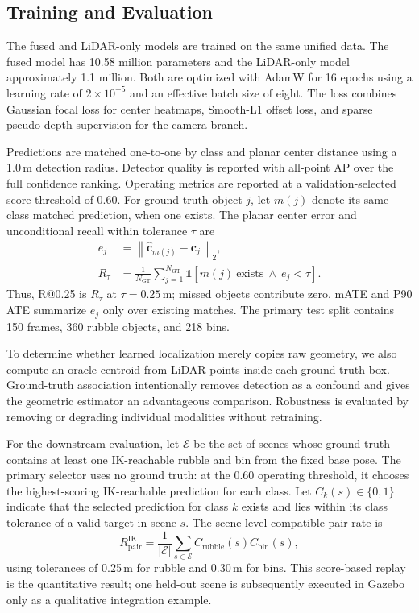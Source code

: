 \documentclass[conference]{IEEEtran}
\begin{document}
\subsection{Training and Evaluation}

The fused and LiDAR-only models are trained on the same unified data. The fused model has 10.58 million parameters and the LiDAR-only model approximately 1.1 million. Both are optimized with AdamW \cite{loshchilov2019decoupled} for 16 epochs using a learning rate of $2\times10^{-5}$ and an effective batch size of eight. The loss combines Gaussian focal loss for center heatmaps, Smooth-L1 offset loss, and sparse pseudo-depth supervision for the camera branch.

Predictions are matched one-to-one by class and planar center distance using a 1.0\,m detection radius. Detector quality is reported with all-point AP over the full confidence ranking. Operating metrics are reported at a validation-selected score threshold of 0.60. For ground-truth object $j$, let $m(j)$ denote its same-class matched prediction, when one exists. The planar center error and unconditional recall within tolerance $\tau$ are
\begin{align}
    e_j &=
    \left\|
    \hat{\mathbf{c}}_{m(j)}-\mathbf{c}_j
    \right\|_2,\\
    R_{\tau} &=
    \frac{1}{N_{\mathrm{GT}}}
    \sum_{j=1}^{N_{\mathrm{GT}}}
    \mathbb{1}\!\left[
    m(j)\ \text{exists}\ \land\ e_j<\tau
    \right].
    \label{eq:r025}
\end{align}
Thus, R@0.25 is $R_{\tau}$ at $\tau=0.25$\,m; missed objects contribute zero. mATE and P90 ATE summarize $e_j$ only over existing matches. The primary test split contains 150 frames, 360 rubble objects, and 218 bins.

To determine whether learned localization merely copies raw geometry, we also compute an oracle centroid from LiDAR points inside each ground-truth box. Ground-truth association intentionally removes detection as a confound and gives the geometric estimator an advantageous comparison. Robustness is evaluated by removing or degrading individual modalities without retraining.

For the downstream evaluation, let $\mathcal{E}$ be the set of scenes whose ground truth contains at least one IK-reachable rubble and bin from the fixed base pose. The primary selector uses no ground truth: at the 0.60 operating threshold, it chooses the highest-scoring IK-reachable prediction for each class. Let $C_k(s)\in\{0,1\}$ indicate that the selected prediction for class $k$ exists and lies within its class tolerance of a valid target in scene $s$. The scene-level compatible-pair rate is
\begin{equation}
    R_{\mathrm{pair}}^{\mathrm{IK}}
    =
    \frac{1}{|\mathcal{E}|}
    \sum_{s\in\mathcal{E}}
    C_{\mathrm{rubble}}(s)
    C_{\mathrm{bin}}(s),
    \label{eq:ik_pair_rate}
\end{equation}
using tolerances of 0.25\,m for rubble and 0.30\,m for bins. This score-based replay is the quantitative result; one held-out scene is subsequently executed in Gazebo only as a qualitative integration example.
\end{document}
